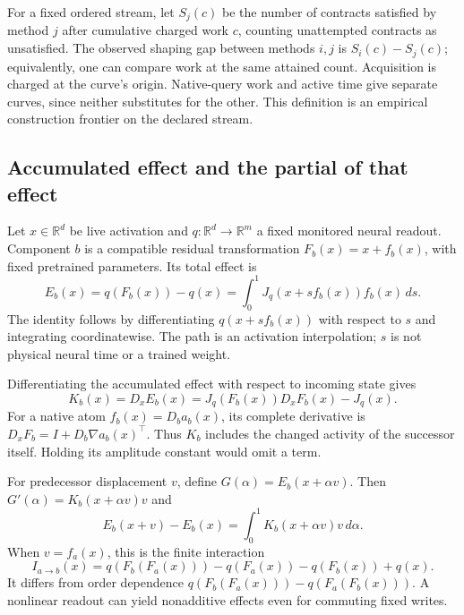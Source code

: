\documentclass[11pt]{article}
\newcommand{\R}{\mathbb{R}}
\begin{document}
For a fixed ordered stream, let $S_j(c)$ be the number of contracts satisfied by
method $j$ after cumulative charged work $c$, counting unattempted contracts as
unsatisfied. The observed shaping gap between methods $i,j$ is
$S_i(c)-S_j(c)$; equivalently, one can compare work at the same attained count.
Acquisition is charged at the curve's origin. Native-query work and active time
give separate curves, since neither substitutes for the other. This definition
is an empirical construction frontier on the declared stream.

\subsection{Accumulated effect and the partial of that effect}
Let $x\in\R^d$ be live activation and $q:\R^d\to\R^m$ a fixed monitored neural
readout. Component $b$ is a compatible residual transformation
$F_b(x)=x+f_b(x)$, with fixed pretrained parameters. Its total effect is
\begin{equation}
 E_b(x)=q(F_b(x))-q(x)
       =\int_0^1 J_q(x+s f_b(x))f_b(x)\,ds .
 \label{eq:effect}
\end{equation}
The identity follows by differentiating $q(x+s f_b(x))$ with respect to $s$
and integrating coordinatewise. The path is an activation interpolation;
$s$ is not physical neural time or a trained weight.

Differentiating the accumulated effect with respect to incoming state gives
\begin{equation}
 K_b(x)=D_xE_b(x)=J_q(F_b(x))D_xF_b(x)-J_q(x).
 \label{eq:context}
\end{equation}
For a native atom $f_b(x)=D_ba_b(x)$, its complete derivative is
$D_xF_b=I+D_b\nabla a_b(x)^\top$. Thus $K_b$ includes the changed activity
of the successor itself. Holding its amplitude constant would omit a term.

For predecessor displacement $v$, define $G(\alpha)=E_b(x+\alpha v)$. Then
$G'(\alpha)=K_b(x+\alpha v)v$ and
\begin{equation}
 E_b(x+v)-E_b(x)=\int_0^1K_b(x+\alpha v)v\,d\alpha .
 \label{eq:conditioning}
\end{equation}
When $v=f_a(x)$, this is the finite interaction
\begin{equation}
 I_{a\to b}(x)=q(F_b(F_a(x)))-q(F_a(x))-q(F_b(x))+q(x).
 \label{eq:interaction}
\end{equation}
It differs from order dependence
$q(F_b(F_a(x)))-q(F_a(F_b(x)))$. A nonlinear readout can yield nonadditive
effects even for commuting fixed writes.
\end{document}
